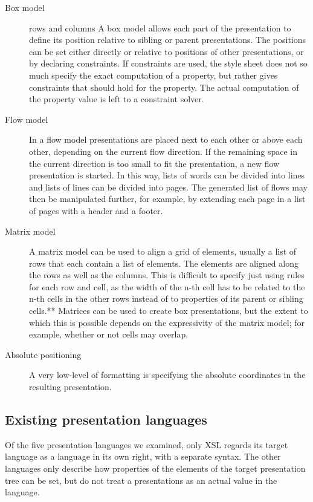 \begin{description}
\item[Box model] rows and columns
A box model allows each part of the presentation to define its position relative to sibling or parent presentations. The positions can be set either directly or relative to positions of other presentations, or by declaring constraints. If constraints are used, the style sheet does not so much specify the exact computation of a property, but rather gives constraints that should hold for the property. The actual computation of the property value is left to a constraint solver. 
\item[Flow model] %
In a flow model presentations are placed next to each other or above each other, depending on the current flow direction. If the remaining space in the current direction is too small to fit the presentation, a new flow presentation is started. In this way, lists of words can be divided into lines and lists of lines can be divided into pages. The generated list of flows may then be manipulated further, for example, by extending each page in a list of pages with a header and a footer.
\item[Matrix model]
A matrix model can be used to align a grid of elements, usually a list of rows that each contain a list of elements. The elements are aligned along the rows as well as the columns. This is difficult to specify just using rules for each row and cell, as the width of the n-th cell has to be related to the n-th cells in the other rows instead of to properties of its parent or sibling cells.** Matrices can be used to create box presentations, but the extent to which this is possible depends on the expressivity of the matrix model; for example, whether or not cells may overlap.
\item[Absolute positioning]
A very low-level of formatting is specifying the absolute coordinates in the resulting presentation.
\end{description}
\fromHere


%																
\subsection{Existing presentation languages} \label{sect:existingtarget}

Of the five presentation languages we examined, only XSL regards its target language as a language in its own right, with a separate syntax. The other languages only describe how properties of the elements of the target presentation tree can be set, but do not treat a presentations as an actual value in the language.

